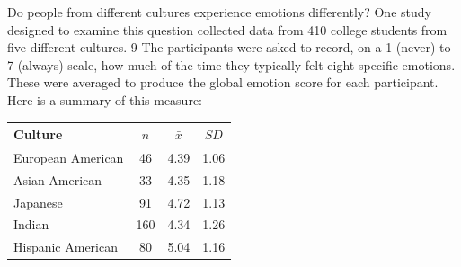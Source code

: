 \documentclass[11pt,answers]{exam}
\begin{document}
\begin{questions}




\newpage



\question Do people from different cultures experience
emotions differently? One study designed to
examine this question collected data from 410
college students from five different cultures. 9 The
participants were asked to record, on a 1 (never)
to 7 (always) scale, how much of the time they
typically felt eight specific emotions. These were
averaged to produce the global emotion score
for each participant. Here is a summary of this
measure: 
\begin{center}
\begin{tabular}{lccc}
\hline
Culture & $n$ & $\bar{x}$ & $SD$ \\
\hline
European American  &  46 & 4.39 & 1.06 \\
Asian American & 33 & 4.35 & 1.18  \\
Japanese & 91 & 4.72 & 1.13   \\
Indian & 160 &  4.34 & 1.26 \\
Hispanic American & 80 & 5.04 & 1.16 \\ \hline
\end{tabular}
\end{center}


\end{questions}
\end{document}
